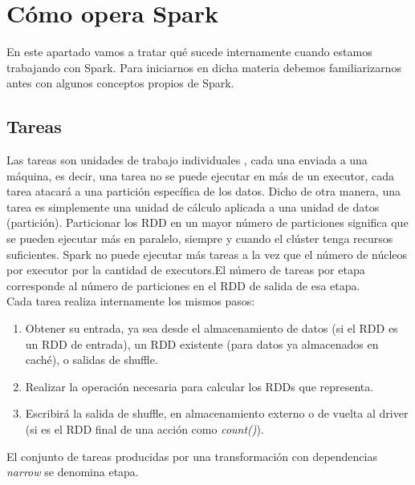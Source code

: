 \chapter{Cómo opera Spark}

En este apartado vamos a tratar qué sucede internamente cuando estamos trabajando con Spark. Para iniciarnos en dicha materia debemos familiarizarnos antes con algunos conceptos propios de Spark.

\section{Tareas}
Las tareas son unidades de trabajo individuales , cada una enviada a una máquina, es decir, una tarea no se puede ejecutar en más de un executor, cada tarea atacará a una partición específica de los datos. Dicho de otra manera, una tarea es simplemente una unidad de cálculo aplicada a una unidad de datos (partición). Particionar los RDD en un mayor número de particiones significa que se pueden ejecutar más en paralelo, siempre y cuando el clúster tenga recursos suficientes. Spark no puede ejecutar más tareas a la vez que el número de núcleos por executor por la cantidad de executors.El número de tareas por etapa corresponde al número de particiones en el RDD de salida de esa etapa.\\

Cada tarea realiza internamente los mismos pasos:\\

\begin{enumerate}

\item Obtener su entrada, ya sea desde el almacenamiento de datos (si el RDD es un RDD de entrada), un RDD existente (para datos ya almacenados en caché), o salidas de shuffle.\\

\item Realizar la operación necesaria para calcular los RDDs que representa.\\

\item Escribirá la salida de shuffle, en almacenamiento externo o de vuelta al driver (si es el RDD final de una acción como \textit{count()}).
\end{enumerate}

El conjunto de tareas producidas por una transformación con dependencias \textit{narrow} se denomina etapa.\\

